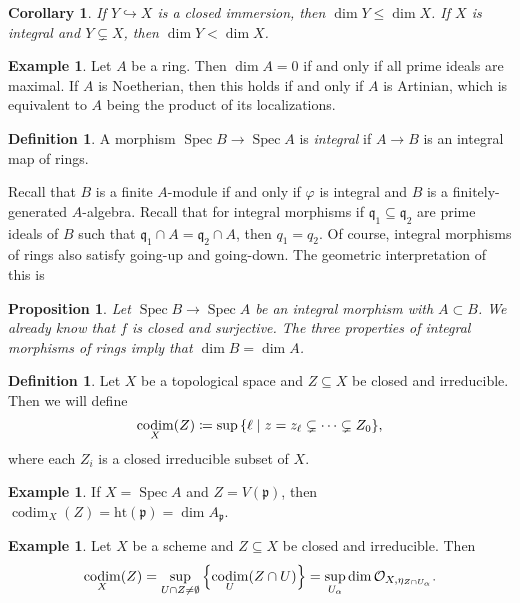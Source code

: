 \documentclass[leqno, openany]{memoir}
\newtheorem{cor}[thm]{Corollary}
\newtheorem{prop}[thm]{Proposition}
\theoremstyle{definition}
\newtheorem{defn}[thm]{Definition}
\newtheorem{exm}[thm]{Example}
\theoremstyle{remark}
\theoremstyle{plain}
\theoremstyle{definition}
\theoremstyle{remark}
\newcommand{\mc}[1]{\mathcal{#1}}
\newcommand{\mf}[1]{\mathfrak{#1}}
\newcommand{\mr}[1]{\mathrm{#1}}
\DeclareMathOperator{\Spec}{Spec}
\DeclareMathOperator{\codim}{codim}
\begin{document}
\begin{cor}
    If $Y \hookrightarrow X$ is a closed immersion, then $\dim Y \leq \dim X$. If $X$ is integral and $Y \subsetneq X$, then $\dim Y < \dim X$.
\end{cor}

\begin{exm}
    Let $A$ be a ring. Then $\dim A = 0$ if and only if all prime ideals are maximal. If $A$ is Noetherian, then this holds if and only if $A$ is Artinian, which is equivalent to $A$ being the product of its localizations.
\end{exm}

\begin{defn}
    A morphism $\Spec B \to \Spec A$ is \textit{integral} if $A \to B$ is an integral map of rings.
\end{defn}

Recall that $B$ is a finite $A$-module if and only if $\varphi$ is integral and $B$ is a finitely-generated $A$-algebra. Recall that for integral morphisms if $\mf{q}_1 \subseteq \mf{q}_2$ are prime ideals of $B$ such that $\mf{q}_1 \cap A = \mf{q}_2 \cap A$, then $q_1 = q_2$. Of course, integral morphisms of rings also satisfy going-up and going-down. The geometric interpretation of this is
\begin{prop}
    Let $\Spec B \to \Spec A$ be an integral morphism with $A \subset B$. We already know that $f$ is closed and surjective. The three properties of integral morphisms of rings imply that $\dim B = \dim A$.
\end{prop}

\begin{defn}
    Let $X$ be a topological space and $Z \subseteq X$ be closed and irreducible. Then we will define
    \[ \codim_X(Z) \coloneqq \sup \qty{\ell \mid z = z_{\ell} \subsetneq \cdots \subsetneq Z_0}, \]
    where each $Z_i$ is a closed irreducible subset of $X$.
\end{defn}

\begin{exm}
    If $X = \Spec A$ and $Z = V(\mf{p})$, then $\codim_X(Z) = \mr{ht}(\mf{p}) = \dim A_{\mf{p}}$.
\end{exm}

\begin{exm}
    Let $X$ be a scheme and $Z \subseteq X$ be closed and irreducible. Then 
    \[ \codim_X(Z) = \sup_{U \cap Z \neq \emptyset} \qty{\codim_U (Z \cap U)} = \sup_{U_{\alpha}} \dim \mc{O}_{X, \eta_{Z \cap U_{\alpha}}}. \]
\end{exm}
\end{document}
